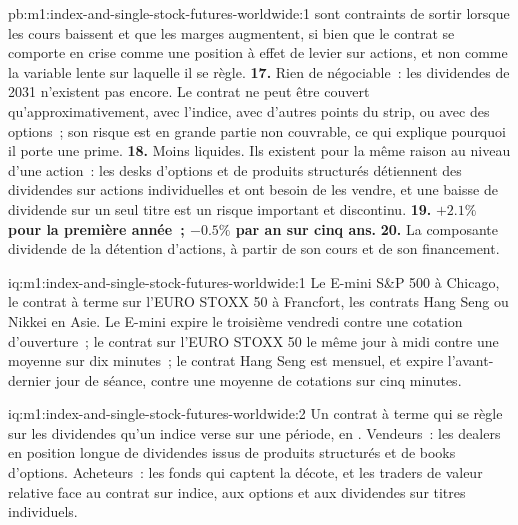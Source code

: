 \begin{solution}{pb:m1:index-and-single-stock-futures-worldwide:1}
sont contraints de sortir lorsque les cours baissent et que les marges augmentent, si bien que le contrat
se comporte en crise comme une position à effet de levier sur actions, et non comme la
variable lente sur laquelle il se règle.
\textbf{17.} Rien de négociable~: les dividendes de 2031 n'existent pas encore. Le
contrat ne peut être couvert qu'approximativement, avec l'indice, avec d'autres
points du strip, ou avec des options~; son risque est en grande partie non couvrable, ce qui
explique pourquoi il porte une prime.
\textbf{18.} Moins liquides. Ils existent pour la même raison au niveau d'une
action~: les desks d'options et de produits structurés détiennent des dividendes sur actions individuelles
et ont besoin de les vendre, et une baisse de dividende sur un seul titre est un
risque important et discontinu.
\textbf{19.} \textbf{$+2.1\%$ pour la première année~; $-0.5\%$ par an sur cinq
ans.}
\textbf{20.} La composante dividende de la détention d'actions, à partir de son cours et de son
financement.
\end{solution}

\begin{solution}{iq:m1:index-and-single-stock-futures-worldwide:1}
Le E-mini S\&P 500 à Chicago, le contrat à terme sur l'EURO STOXX 50 à Francfort, les
contrats Hang Seng ou Nikkei en Asie. Le E-mini expire le troisième vendredi
contre une cotation d'ouverture~; le contrat sur l'EURO STOXX 50 le même jour à midi
contre une moyenne sur dix minutes~; le contrat Hang Seng est mensuel,
et expire l'avant-dernier jour de séance, contre une moyenne de cotations sur cinq minutes.
\end{solution}

\begin{solution}{iq:m1:index-and-single-stock-futures-worldwide:2}
Un contrat à terme qui se règle sur les dividendes qu'un indice verse sur
une période, en . Vendeurs~: les dealers en position longue de dividendes
issus de produits structurés et de books d'options. Acheteurs~: les fonds qui captent la
décote, et les traders de valeur relative face au contrat sur indice, aux options et aux dividendes sur titres individuels.
\end{solution}

